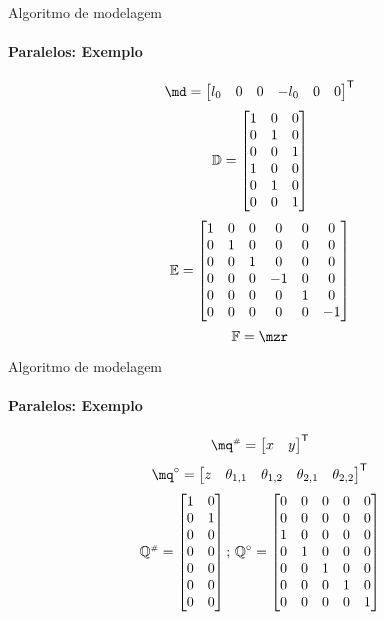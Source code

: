 \documentclass[25pt,landscape]{beamer}
\begin{document}
\begin{frame}{Algoritmo de modelagem}
    \framesubtitle{Paralelos: Exemplo}
    $$ \md = 
		\begin{bmatrix}
			l_0 &
			0 &
			0 &
			-l_0 &
			0 &
			0
		\end{bmatrix}^\msT $$
		$$ \mathbb{D} = 
		\begin{bmatrix}
			1 & 0 & 0\\
			0 & 1 & 0\\
			0 & 0 & 1\\
			1 & 0 & 0\\
			0 & 1 & 0\\
			0 & 0 & 1\\
		\end{bmatrix} $$
		$$ \mathbb{E} = 
		\begin{bmatrix}
			1 & 0 & 0 & 0 & 0 & 0 \\
			0 & 1 & 0 & 0 & 0 & 0 \\
			0 & 0 & 1 & 0 & 0 & 0 \\
			0 & 0 & 0 & -1 & 0 & 0 \\
			0 & 0 & 0 & 0 & 1 & 0 \\
			0 & 0 & 0 & 0 & 0 & -1 \\
		\end{bmatrix} $$
	$$ \mF = \mzr $$
\end{frame}

\begin{frame}{Algoritmo de modelagem}
    \framesubtitle{Paralelos: Exemplo}
    $$ \mq\ssh = 
		\begin{bmatrix}
			x &
			y 
		\end{bmatrix}^\msT
	$$
	$$ \mq\cir = 
		\begin{bmatrix}
			z &
			\theta_{1,1} &
			\theta_{1,2} &
			\theta_{2,1} &
			\theta_{2,2} 
		\end{bmatrix}^\msT
	$$
	\pause
	$$ \mathbb{Q}^{\scriptscriptstyle \#} =
		\begin{bmatrix}
			1 & 0 \\
			0 & 1 \\
			0 & 0 \\
			0 & 0 \\
			0 & 0 \\
			0 & 0 \\
			0 & 0 \\
		\end{bmatrix}; \,
		\mathbb{Q}^{\scriptstyle \circ} =
		\begin{bmatrix}
			0 & 0 & 0 & 0 & 0 \\
			0 & 0 & 0 & 0 & 0 \\
			1 & 0 & 0 & 0 & 0 \\
			0 & 1 & 0 & 0 & 0 \\
			0 & 0 & 1 & 0 & 0 \\
			0 & 0 & 0 & 1 & 0 \\
			0 & 0 & 0 & 0 & 1 \\
		\end{bmatrix} $$
\end{frame}
\end{document}
